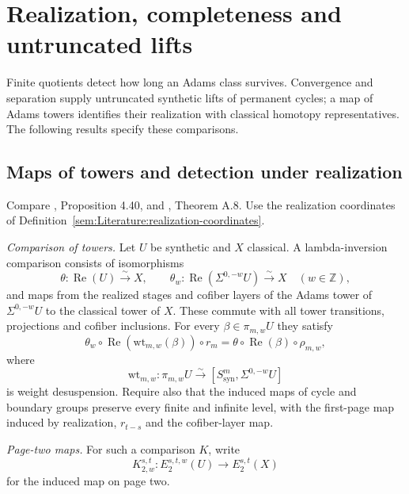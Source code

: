 \section{Realization, completeness and untruncated lifts}
Finite quotients detect how long an Adams class survives. Convergence
and separation supply untruncated synthetic lifts of permanent cycles;
a map of Adams towers identifies their realization with classical
homotopy representatives. The following results specify these comparisons.

\subsection{Maps of towers and detection under realization}

\begin{definition}
\label{sem:Literature:lambda-inversion-object-comparison}
\label{sem:Literature:lambda-inversion-e2-map}
\label{sem:Literature:lambda-inversion-adams-comparison}
Compare \cite{Pst}, Proposition 4.40, and \cite{BHS}, Theorem A.8.
Use the realization coordinates of
Definition~\ref{sem:Literature:realization-coordinates}.

\emph{Comparison of towers.} Let $U$ be synthetic and $X$ classical.
A lambda-inversion comparison consists of isomorphisms
\[
 \theta:\operatorname{Re}(U)\xrightarrow{\sim}X,\qquad
 \theta_w:\operatorname{Re}(\Sigma^{0,-w}U)\xrightarrow{\sim}X
 \quad(w\in\mathbb Z),
\]
and maps from the realized stages and cofiber layers of the Adams tower
of $\Sigma^{0,-w}U$ to the classical tower of $X$. These commute with
all tower transitions, projections and cofiber inclusions. For every
$\beta\in\pi_{m,w}U$ they satisfy
\[
 \theta_w\circ\operatorname{Re}(\mathrm{wt}_{m,w}(\beta))\circ r_m
 =\theta\circ\operatorname{Re}(\beta)\circ\rho_{m,w},
\]
where
\[
 \mathrm{wt}_{m,w}:\pi_{m,w}U\xrightarrow{\sim}
 [S^m_{\mathrm{syn}},\Sigma^{0,-w}U]
\]
is weight desuspension. Require also that the
induced maps of cycle and boundary groups preserve every finite and
infinite level, with the first-page map induced by realization,
$r_{t-s}$ and the cofiber-layer map.

\emph{Page-two maps.} For such a comparison $K$, write
\[
 K_{2,w}^{s,t}:E_2^{s,t,w}(U)\longrightarrow E_2^{s,t}(X)
\]
for the induced map on page two.


\end{definition}
